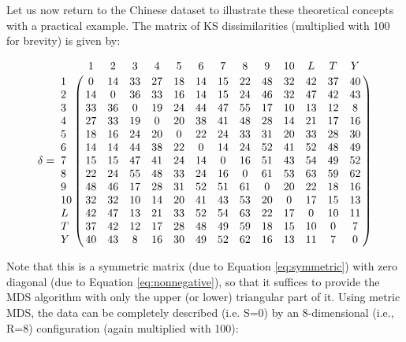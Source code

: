 \documentclass[authoryear,preprint,review,12pt]{elsarticle}
\begin{document}
Let us now return to the Chinese dataset to illustrate these
theoretical concepts with a practical example.  The matrix of
KS dissimilarities (multiplied with 100 for brevity) is given by:

\begin{equation}
\delta = \bordermatrix{
~ & 1 & 2 & 3 & 4 & 5 & 6 & 7 & 8 & 9 & 10 & L & T & Y\cr
1 & 0 & 14 & 33 & 27 & 18 & 14 & 15 & 22 & 48 & 32 & 42 & 37 & 40 \cr
2 & 14 & 0 & 36 & 33 & 16 & 14 & 15 & 24 & 46 & 32 & 47 & 42 & 43 \cr
3 & 33 & 36 & 0 & 19 & 24 & 44 & 47 & 55 & 17 & 10 & 13 & 12 & 8 \cr
4 & 27 & 33 & 19 & 0 & 20 & 38 & 41 & 48 & 28 & 14 & 21 & 17 & 16 \cr
5 & 18 & 16 & 24 & 20 & 0 & 22 & 24 & 33 & 31 & 20 & 33 & 28 & 30 \cr
6 & 14 & 14 & 44 & 38 & 22 & 0 & 14 & 24 & 52 & 41 & 52 & 48 & 49 \cr
7 & 15 & 15 & 47 & 41 & 24 & 14 & 0 & 16 & 51 & 43 & 54 & 49 & 52 \cr
8 & 22 & 24 & 55 & 48 & 33 & 24 & 16 & 0 & 61 & 53 & 63 & 59 & 62 \cr
9 & 48 & 46 & 17 & 28 & 31 & 52 & 51 & 61 & 0 & 20 & 22 & 18 & 16 \cr
10 & 32 & 32 & 10 & 14 & 20 & 41 & 43 & 53 & 20 & 0 & 17 & 15 & 13 \cr
L & 42 & 47 & 13 & 21 & 33 & 52 & 54 & 63 & 22 & 17 & 0 & 10 & 11 \cr
T & 37 & 42 & 12 & 17 & 28 & 48 & 49 & 59 & 18 & 15 & 10 & 0 & 7 \cr
Y & 40 & 43 & 8 & 16 & 30 & 49 & 52 & 62 & 16 & 13 & 11 & 7 & 0
}
\label{eq:deltamuus}
\end{equation}

Note that this is a symmetric matrix (due to Equation
\ref{eq:symmetric}) with zero diagonal (due to Equation
\ref{eq:nonnegative}), so that it suffices to provide the MDS
algorithm with only the upper (or lower) triangular part of it.  Using
metric MDS, the data can be completely described (i.e. S=0) by an
8-dimensional (i.e., R=8) configuration (again multiplied with 100):
\end{document}
